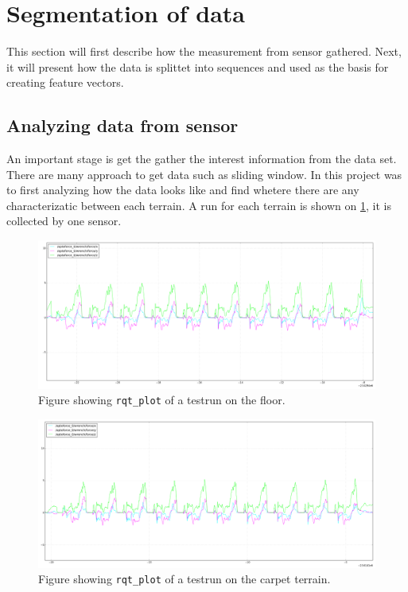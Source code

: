 \documentclass[USenglish]{ifimaster}  %
\begin{document}
\section{Segmentation of data}
This section will first describe how the measurement from sensor gathered. Next, it will present how the data is splittet into sequences and used as the basis for creating feature vectors.

\subsection{Analyzing data from sensor}
An important stage is get the gather the interest information from the data set. There are many approach to get data such as sliding window. In this project was to first analyzing how the data looks like and find whetere there are any characterizatic between each terrain. A run for each terrain is shown on \ref{fig:graphf}, it is collected by one sensor.


\begin{figure}[h]
    \centering
    \includegraphics[width=\textwidth,height=\textheight,keepaspectratio]{Figures/gulvgraf}
    \caption{Figure showing \texttt{rqt\_plot} of a testrun on the floor.}
    \label{fig:graphf}
\end{figure}

\begin{figure}[h]
    \centering
    \includegraphics[width=\textwidth,height=\textheight,keepaspectratio]{Figures/teppegraf}
    \caption{Figure showing \texttt{rqt\_plot} of a testrun on the carpet terrain.}
    \label{fig:grapht}
\end{figure}
\end{document}
